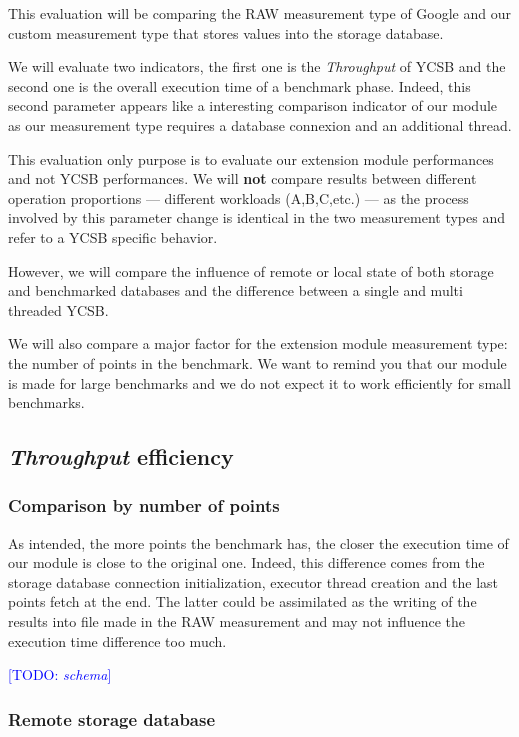 \documentclass[a4paper,11pt]{report}
\newcommand*{\todo}[1]{\textcolor{blue}{[TODO: \emph{#1}]}}
\begin{document}
This evaluation will be comparing the RAW measurement type of Google and our custom measurement type that stores values into the storage database.

We will evaluate two indicators, the first one is the \textit{Throughput} of YCSB and the second one is the overall execution time of a benchmark phase. Indeed, this second parameter appears like a interesting comparison indicator of our module as our measurement type requires a database connexion and an additional thread.

\bigskip

This evaluation only purpose is to evaluate our extension module performances and not YCSB performances. We will \textbf{not} compare results between different operation proportions --- different workloads (A,B,C,etc.) --- as the process involved by this parameter change is identical in the two measurement types and refer to a YCSB specific behavior. 

However, we will compare the influence of remote or local state of both storage and benchmarked databases and the difference between a single and multi threaded YCSB. 

We will also compare a major factor for the extension module measurement type: the number of points in the benchmark. We want to remind you that our module is made for large benchmarks and we do not expect it to work efficiently for small benchmarks.

\subsection{\textit{Throughput} efficiency}

\subsubsection{Comparison by number of points}

As intended, the more points the benchmark has, the closer the execution time of our module is close to the original one. Indeed, this difference comes from the storage database connection initialization, executor thread creation and the last points fetch at the end. The latter could be assimilated as the writing of the results into file made in the RAW measurement and may not influence the execution time difference too much.

\todo{schema}

\subsubsection{Remote storage database}
\end{document}
